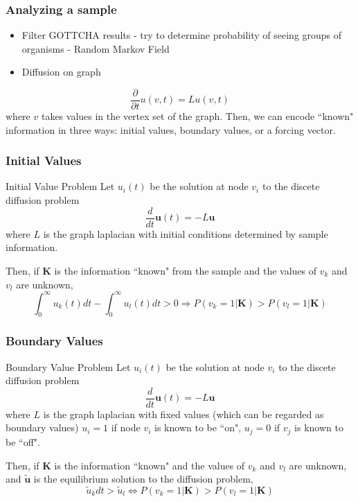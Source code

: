 \documentclass{beamer}
\renewcommand{\b}{\bm}
\begin{document}
\begin{frame}
\frametitle{Analyzing a sample}
\begin{itemize}
	\item Filter GOTTCHA results - try to determine probability of seeing groups of organisms - Random Markov Field
 	\item Diffusion on graph
\end{itemize}
\[
\frac{\partial}{\partial t} u(v,t) = L u(v,t)
\]
where $v$ takes values in the vertex set of the graph. Then, we can encode ``known" information in three ways: initial values, boundary values, or a forcing vector.



\end{frame}
\begin{frame}
\frametitle{Initial Values}
\begin{block}{Initial Value Problem}
	Let $u_i(t)$ be the solution at node $v_i$ to the discete diffusion problem
	\[
	\frac{d}{dt}\b{u}(t)  = - L\b{u}
	\]
	where $L$ is the  graph laplacian with initial conditions determined by sample information.
	
	Then, if $\b{K}$ is the information ``known" from the sample and the values of $v_{k}$ and $v_{l}$ are unknown,
	\[
	\int_0^{\infty} u_k(t) dt - \int_0^{\infty} u_l(t) dt >  0 \Rightarrow  P(v_k=  1|\b{K}) > P(v_l = 1|\b{K})
	\]
\end{block}
\end{frame}
\begin{frame}
\frametitle{Boundary Values}
	\begin{block}{Boundary Value Problem}
	Let $u_i(t)$ be the solution at node $v_i$ to the discete diffusion problem
	\[
	\frac{d}{dt}\b{u}(t)  = - L\b{u}
	\]
	where $L$ is the  graph laplacian with fixed values (which can be regarded as boundary values) $u_i = 1$ if node $v_i$ is known to be ``on", $u_j = 0$ if $v_j$ is known to be ``off". 
	
	Then, if $\b{K}$ is the information ``known" and the values of $v_{k}$ and $v_{l}$ are unknown, and $\b{\tilde{u}}$ is the equilibrium solution to the diffusion problem,
	\[
	\tilde{u}_k dt >  \tilde{u}_l \Leftrightarrow  P(v_k=  1|\b{K}) > P(v_l = 1|\b{K})
	\]
\end{block}
\end{frame}
\end{document}
